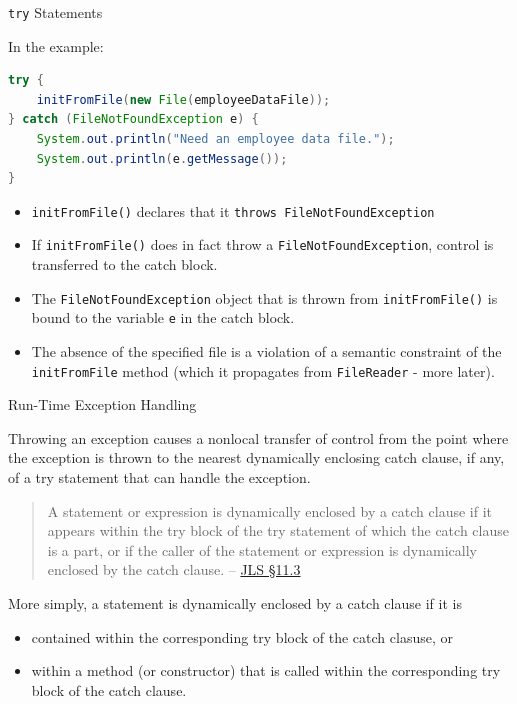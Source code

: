 \documentclass{beamer}
\begin{document}
\begin{frame}[fragile]{{\tt try} Statements}


In the example:
\begin{lstlisting}[language=Java]
try {
    initFromFile(new File(employeeDataFile));
} catch (FileNotFoundException e) {
    System.out.println("Need an employee data file.");
    System.out.println(e.getMessage());
}
\end{lstlisting}
\vspace{-.1in}
\begin{itemize}
\item {\tt initFromFile()} declares that it {\tt throws FileNotFoundException}
\item If {\tt initFromFile()} does in fact throw a {\tt FileNotFoundException}, control is transferred to the catch block.
\item The {\tt FileNotFoundException} object that is thrown from {\tt initFromFile()} is bound to the variable {\tt e} in the catch block.
\item The absence of the specified file is a violation of a semantic constraint of the {\tt initFromFile} method (which it propagates from {\tt FileReader} - more later).
\end{itemize}


\end{frame}

\begin{frame}[fragile]{Run-Time Exception Handling}


Throwing an exception causes a nonlocal transfer of control from the point where the exception is thrown to the nearest dynamically enclosing catch clause, if any, of a try statement that can handle the exception.
\begin{quote}
A statement or expression is dynamically enclosed by a catch clause if it appears within the try block of the try statement of which the catch clause is a part, or if the caller of the statement or expression is dynamically enclosed by the catch clause. -- \href{http://docs.oracle.com/javase/specs/jls/se7/html/jls-11.html#jls-11.3}{JLS \S 11.3}
\end{quote}
More simply, a statement is dynamically enclosed by a catch clause if it is
\begin{itemize}
\item contained within the corresponding try block of the catch clasuse, or
\item  within a method (or constructor) that is called within the corresponding try block of the catch clause. 
\end{itemize}

\end{frame}
\end{document}
